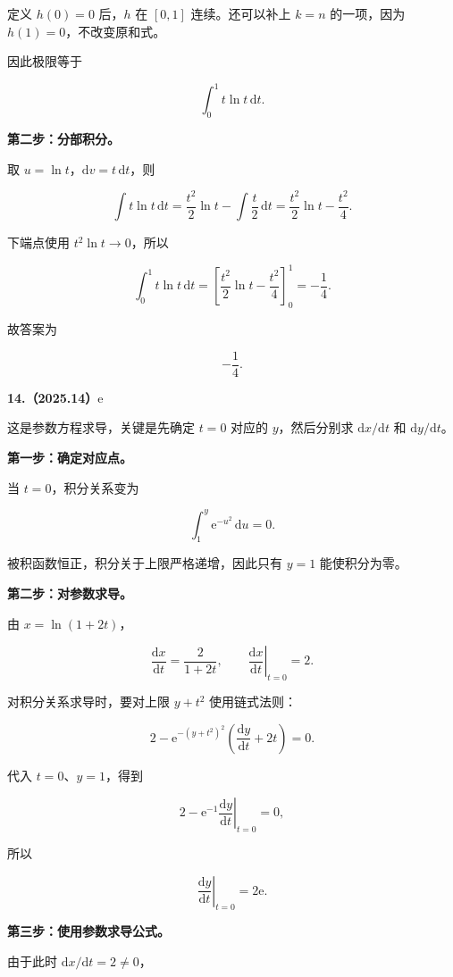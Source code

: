 \documentclass[UTF8,11pt,fontset=windows]{ctexart}
\begin{document}
定义 $h(0)=0$ 后，$h$ 在 $[0,1]$ 连续。还可以补上 $k=n$ 的一项，因为 $h(1)=0$，不改变原和式。

因此极限等于

$$
\int_0^1t\ln t\,\mathrm dt.
$$

\textbf{第二步：分部积分。}

取 $u=\ln t$，$\mathrm dv=t\,\mathrm dt$，则

$$
\int t\ln t\,\mathrm dt
=\frac{t^2}{2}\ln t-\int\frac t2\,\mathrm dt
=\frac{t^2}{2}\ln t-\frac{t^2}{4}.
$$

下端点使用 $t^2\ln t\to0$，所以

$$
\int_0^1t\ln t\,\mathrm dt
=\left[\frac{t^2}{2}\ln t-\frac{t^2}{4}\right]_0^1
=-\frac14.
$$

故答案为

$$
\boxed{-\frac14}.
$$

\clearpage

\textbf{14.（2025.14）$\mathrm e$}

这是参数方程求导，关键是先确定 $t=0$ 对应的 $y$，然后分别求 $\mathrm dx/\mathrm dt$ 和 $\mathrm dy/\mathrm dt$。

\textbf{第一步：确定对应点。}

当 $t=0$，积分关系变为

$$
\int_1^y\mathrm e^{-u^2}\,\mathrm du=0.
$$

被积函数恒正，积分关于上限严格递增，因此只有 $y=1$ 能使积分为零。

\textbf{第二步：对参数求导。}

由 $x=\ln(1+2t)$，

$$
\frac{\mathrm dx}{\mathrm dt}=\frac2{1+2t},
\qquad \left.\frac{\mathrm dx}{\mathrm dt}\right|_{t=0}=2.
$$

对积分关系求导时，要对上限 $y+t^2$ 使用链式法则：

$$
2-\mathrm e^{-(y+t^2)^2}
\left(\frac{\mathrm dy}{\mathrm dt}+2t\right)=0.
$$

代入 $t=0$、$y=1$，得到

$$
2-\mathrm e^{-1}\left.\frac{\mathrm dy}{\mathrm dt}\right|_{t=0}=0,
$$

所以

$$
\left.\frac{\mathrm dy}{\mathrm dt}\right|_{t=0}=2\mathrm e.
$$

\textbf{第三步：使用参数求导公式。}

由于此时 $\mathrm dx/\mathrm dt=2\ne0$，
\end{document}
